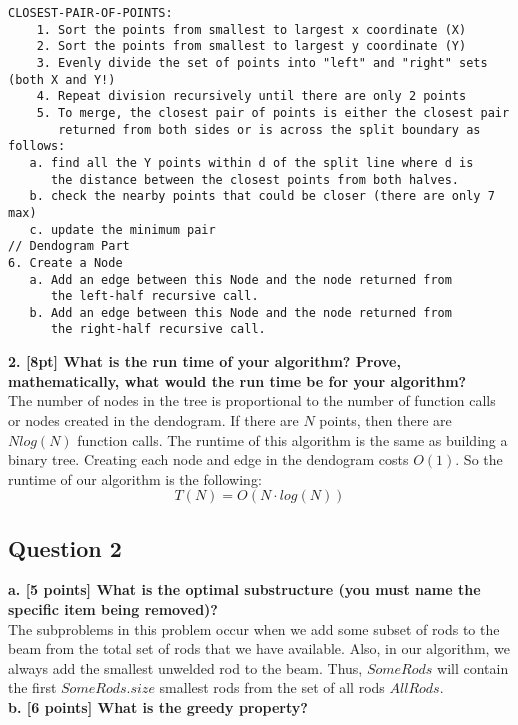\documentclass[12pt]{article}
\begin{document}
\begin{verbatim}
CLOSEST-PAIR-OF-POINTS:
	1. Sort the points from smallest to largest x coordinate (X)
	2. Sort the points from smallest to largest y coordinate (Y)
	3. Evenly divide the set of points into "left" and "right" sets (both X and Y!)
	4. Repeat division recursively until there are only 2 points
	5. To merge, the closest pair of points is either the closest pair 
	   returned from both sides or is across the split boundary as follows:
   a. find all the Y points within d of the split line where d is 
      the distance between the closest points from both halves.
   b. check the nearby points that could be closer (there are only 7 max)
   c. update the minimum pair 
// Dendogram Part
6. Create a Node 
   a. Add an edge between this Node and the node returned from 
      the left-half recursive call.
   b. Add an edge between this Node and the node returned from 
      the right-half recursive call.
\end{verbatim} 

\textbf{2. [8pt] What is the run time of your algorithm? Prove, mathematically, what would
the run time be for your algorithm?} \\

The number of nodes in the tree is proportional to the number of function calls or nodes
created in the dendogram. If there are $N$ points, then there are $N log(N)$ function calls. 
The runtime of this algorithm is the same as building a binary tree. Creating 
each node and edge in the dendogram costs $O(1)$. So the runtime of our algorithm is the following: 
\[
  T(N) = O(N \cdot log(N))
\]

\subsection*{Question 2}
\textbf{a. [5 points] What is the optimal substructure (you must name the specific item being removed)?} \\

The subproblems in this problem occur when we add some subset of rods to the beam from the total set of rods that we have available. Also, in our algorithm, we always add the smallest unwelded rod to the beam. Thus, $SomeRods$ will contain the first $SomeRods.size$ smallest rods from the set of all rods $AllRods$.  \\

\newpage
\noindent \textbf{b. [6 points] What is the greedy property? } \\
\end{document}

